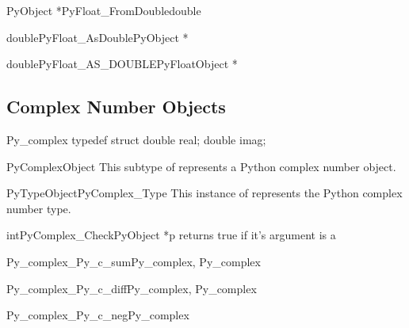 \documentclass[twoside,openright]{report}
\begin{document}
\begin{cfuncdesc}{PyObject *}{PyFloat_FromDouble}{double}

\end{cfuncdesc}

\begin{cfuncdesc}{double}{PyFloat_AsDouble}{PyObject *}

\end{cfuncdesc}

\begin{cfuncdesc}{double}{PyFloat_AS_DOUBLE}{PyFloatObject *}

\end{cfuncdesc}


\subsection{Complex Number Objects}

\begin{ctypedesc}{Py_complex}
typedef struct {
   double real;
   double imag;
} 
\end{ctypedesc}

\begin{ctypedesc}{PyComplexObject}
This subtype of  represents a Python complex number object.
\end{ctypedesc}

\begin{cvardesc}{PyTypeObject}{PyComplex_Type}
This instance of  represents the Python complex 
number type.
\end{cvardesc}

\begin{cfuncdesc}{int}{PyComplex_Check}{PyObject *p}
returns true if it's argument is a 
\end{cfuncdesc}

\begin{cfuncdesc}{Py_complex}{_Py_c_sum}{Py_complex, Py_complex}

\end{cfuncdesc}

\begin{cfuncdesc}{Py_complex}{_Py_c_diff}{Py_complex, Py_complex}

\end{cfuncdesc}

\begin{cfuncdesc}{Py_complex}{_Py_c_neg}{Py_complex}

\end{cfuncdesc}
\end{document}

